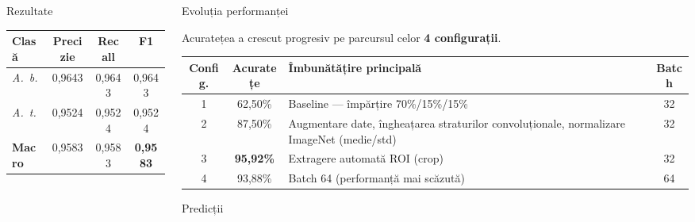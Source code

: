 \documentclass[final]{beamer}
\begin{document}
\begin{frame}[fragile]
\begin{columns}[t]
\begin{column}{0.3\paperwidth}
\begin{block}{Rezultate}
\smallskip

\begin{table}
\centering
\normalsize
\begin{tabular}{@{} lccc @{}}
    \toprule
    \textbf{Clasă} & \textbf{Precizie} & \textbf{Recall} & \textbf{F1} \\
    \midrule
    \textit{A.~b.} & 0,9643 & 0,9643 & 0,9643 \\
    \textit{A.~t.} & 0,9524 & 0,9524 & 0,9524 \\
    \midrule
    \textbf{Macro} & 0,9583 & 0,9583 & \textbf{0,9583} \\
    \bottomrule
\end{tabular}
\end{table}

\end{block}

\end{column}

\separatorcolumn

\begin{column}{0.3\paperwidth}

\begin{block}{Evoluția performanței}

Acuratețea a crescut progresiv pe parcursul celor \textbf{4 configurații}.

\smallskip

\begin{table}
\centering
\begin{tabularx}{0.98\linewidth}{@{} c c X c @{}}
    \toprule
    \textbf{Config.} & \textbf{Acuratețe} & \textbf{Îmbunătățire principală} & \textbf{Batch} \\
    \midrule
    1 & 62,50\% & Baseline --- împărțire 70\%/15\%/15\% & 32 \\
    2 & 87,50\% & Augmentare date, îngheațarea straturilor convoluționale, normalizare ImageNet (medie/std) & 32 \\
    3 & \textcolor{UVTDarkBlue}{\textbf{95,92\%}} & Extragere automată ROI (crop) & 32 \\
    4 & 93,88\% & Batch 64 (performanță mai scăzută) & 64 \\
    \bottomrule
\end{tabularx}
\end{table}

\end{block}

\begin{block}{Predicții}


\end{block}
\end{column}
\end{columns}
\end{frame}
\end{document}
